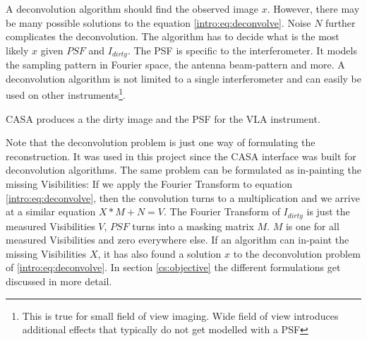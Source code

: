 A deconvolution algorithm should find the observed image $x$. However, there may be many possible solutions to the equation \eqref{intro:eq:deconvolve}. Noise $N$ further complicates the deconvolution. The algorithm has to decide what is the most likely $x$ given $PSF$ and $I_{dirty}$. The PSF is specific to the interferometer. It models the sampling pattern in Fourier space, the antenna beam-pattern and more. A deconvolution algorithm is not limited to a single interferometer and can easily be used on other instruments\footnote{This is true for small field of view imaging. Wide field of view introduces additional effects that typically do not get modelled with a PSF}.

CASA produces a the dirty image and the PSF for the VLA instrument.

Note that the deconvolution problem is just one way of formulating the reconstruction. It was used in this project since the CASA interface was built for deconvolution algorithms. The same problem can be formulated as in-painting the missing Visibilities: If we apply the Fourier Transform to equation \eqref{intro:eq:deconvolve}, then the convolution turns to a multiplication and we arrive at a similar equation $X*M + N = V$. The Fourier Transform of $I_{dirty}$ is just the measured Visibilities $V$,  $PSF$ turns into a masking matrix $M$. $M$ is one for all measured Visibilities and zero everywhere else. If an algorithm can in-paint the missing Visibilities $X$, it has also found a solution $x$ to the deconvolution problem of \eqref{intro:eq:deconvolve}. In section \ref{cs:objective} the different formulations get discussed in more detail.


